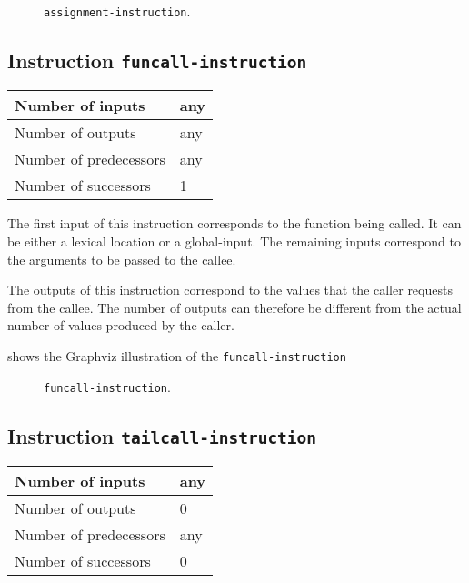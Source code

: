 \begin{figure}
\begin{center}
\end{center}
\caption{\label{fig-assignment-instruction}
\texttt{assignment-instruction}.}
\end{figure}

\subsection{Instruction \texttt{funcall-instruction}}
\label{mir-instruction-funcall}

\begin{tabular}{|l|l|}
\hline
Number of inputs & any\\
\hline
Number of outputs & any\\
\hline
Number of predecessors & any\\
\hline
Number of successors & 1\\
\hline
\end{tabular}

The first input of this instruction corresponds to the function being
called.  It can be either a lexical location or a global-input.  
The remaining inputs correspond to the arguments to be passed to the
callee. 

The outputs of this instruction correspond to the values that the
caller requests from the callee.  The number of outputs can therefore
be different from the actual number of values produced by the caller.

 shows the Graphviz illustration of the
\texttt{funcall-instruction}

\begin{figure}
\begin{center}
\end{center}
\caption{\label{fig-funcall-instruction}
\texttt{funcall-instruction}.}
\end{figure}

\subsection{Instruction \texttt{tailcall-instruction}}
\label{mir-instruction-tailcall}

\begin{tabular}{|l|l|}
\hline
Number of inputs & any\\
\hline
Number of outputs & 0\\
\hline
Number of predecessors & any\\
\hline
Number of successors & 0\\
\hline
\end{tabular}


